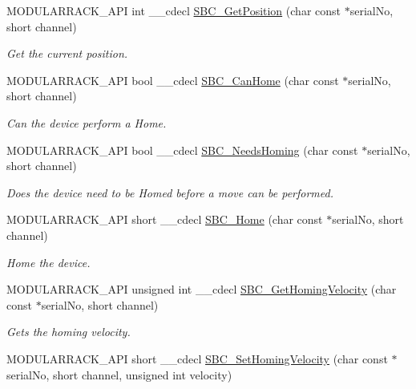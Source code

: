 \begin{DoxyCompactItemize}
M\+O\+D\+U\+L\+A\+R\+R\+A\+C\+K\+\_\+\+A\+PI int \+\_\+\+\_\+cdecl \hyperlink{group___modular_stepper_gae7d4de43dfa8f130221a8fd18671af55}{S\+B\+C\+\_\+\+Get\+Position} (char const $\ast$serial\+No, short channel)
\begin{DoxyCompactList}\small\item\em Get the current position. \end{DoxyCompactList}\item 
M\+O\+D\+U\+L\+A\+R\+R\+A\+C\+K\+\_\+\+A\+PI bool \+\_\+\+\_\+cdecl \hyperlink{group___modular_stepper_gad9dae4a56f32e840d4b46cceac5dc334}{S\+B\+C\+\_\+\+Can\+Home} (char const $\ast$serial\+No, short channel)
\begin{DoxyCompactList}\small\item\em Can the device perform a Home. \end{DoxyCompactList}\item 
M\+O\+D\+U\+L\+A\+R\+R\+A\+C\+K\+\_\+\+A\+PI bool \+\_\+\+\_\+cdecl \hyperlink{group___modular_stepper_ga01ad6703b08dda3f2420f8b7b6ce5aee}{S\+B\+C\+\_\+\+Needs\+Homing} (char const $\ast$serial\+No, short channel)
\begin{DoxyCompactList}\small\item\em Does the device need to be Homed before a move can be performed. \end{DoxyCompactList}\item 
M\+O\+D\+U\+L\+A\+R\+R\+A\+C\+K\+\_\+\+A\+PI short \+\_\+\+\_\+cdecl \hyperlink{group___modular_stepper_ga7e8b41aa8b2f44fe98a9d1a36947c864}{S\+B\+C\+\_\+\+Home} (char const $\ast$serial\+No, short channel)
\begin{DoxyCompactList}\small\item\em Home the device. \end{DoxyCompactList}\item 
M\+O\+D\+U\+L\+A\+R\+R\+A\+C\+K\+\_\+\+A\+PI unsigned int \+\_\+\+\_\+cdecl \hyperlink{group___modular_stepper_gae142d396877fc8f519c98f7896413af1}{S\+B\+C\+\_\+\+Get\+Homing\+Velocity} (char const $\ast$serial\+No, short channel)
\begin{DoxyCompactList}\small\item\em Gets the homing velocity. \end{DoxyCompactList}\item 
M\+O\+D\+U\+L\+A\+R\+R\+A\+C\+K\+\_\+\+A\+PI short \+\_\+\+\_\+cdecl \hyperlink{group___modular_stepper_ga52c4d643e2b2b913cfad1526f875abea}{S\+B\+C\+\_\+\+Set\+Homing\+Velocity} (char const $\ast$serial\+No, short channel, unsigned int velocity)

\end{DoxyCompactItemize}
